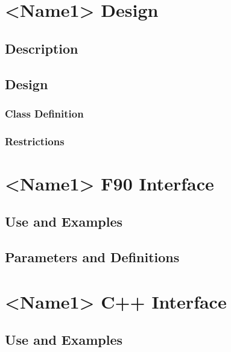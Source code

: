 \documentclass[]{article}
\begin{document}
\section{<Name1> Design}

\subsection{Description}


\subsection{Design}


\subsubsection{Class Definition}


\subsubsection{Restrictions}


\section{<Name1> F90 Interface}

\subsection{Use and Examples}


\subsection{Parameters and Definitions}




\section{<Name1> C++ Interface}

\subsection{Use and Examples}

\end{document}
